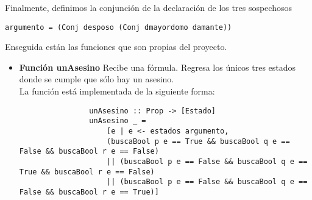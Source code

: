 \documentclass[letterpaper,12pt]{article}
\begin{document}
\begin{itemize}
        Finalmente, definimos la conjunción de la declaración de los tres 
        sospechosos
        \begin{center}
            \texttt{argumento = (Conj desposo (Conj dmayordomo damante))}
        \end{center}

        Enseguida están las funciones que son propias del proyecto.

        \begin{itemize}
            \item \textbf{Función unAsesino} Recibe una fórmula. Regresa los
            únicos tres estados donde se cumple que sólo hay un asesino. \\
            La función está implementada de la siguiente forma:
            \begin{lstlisting}
                unAsesino :: Prop -> [Estado]
                unAsesino _ = 
                    [e | e <- estados argumento, 
                    (buscaBool p e == True && buscaBool q e == False && buscaBool r e == False)
                    || (buscaBool p e == False && buscaBool q e == True && buscaBool r e == False)
                    || (buscaBool p e == False && buscaBool q e == False && buscaBool r e == True)]
            \end{lstlisting}


\end{itemize}
\end{itemize}
\end{document}
